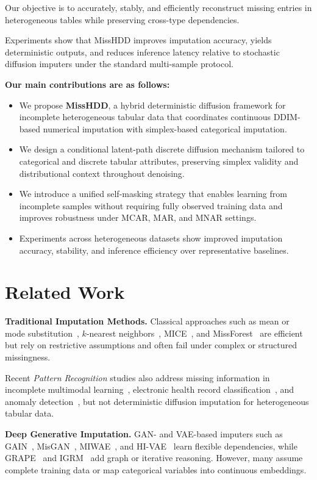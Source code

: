\documentclass[times, review, 10pt]{elsarticle}
\begin{document}
Our objective is to accurately, stably, and efficiently reconstruct missing entries in heterogeneous tables while preserving cross-type dependencies.

Experiments show that MissHDD improves imputation accuracy, yields deterministic outputs, and reduces inference latency relative to stochastic diffusion imputers under the standard multi-sample protocol.

\textbf{Our main contributions are as follows:}
\begin{itemize}
\item We propose \textbf{MissHDD}, a hybrid deterministic diffusion framework for incomplete heterogeneous tabular data that coordinates continuous DDIM-based numerical imputation with simplex-based categorical imputation.
\item We design a conditional latent-path discrete diffusion mechanism tailored to categorical and discrete tabular attributes, preserving simplex validity and distributional context throughout denoising.
\item We introduce a unified self-masking strategy that enables learning from incomplete samples without requiring fully observed training data and improves robustness under MCAR, MAR, and MNAR settings.
\item Experiments across heterogeneous datasets show improved imputation accuracy, stability, and inference efficiency over representative baselines.
\end{itemize}

\section{Related Work}

\textbf{Traditional Imputation Methods.}
Classical approaches such as mean or mode substitution~\cite{mean,mean2},
$k$-nearest neighbors~\cite{knn}, MICE~\cite{mice}, and
MissForest~\cite{missforest} are efficient but rely on restrictive assumptions
and often fail under complex or structured missingness.

Recent \textit{Pattern Recognition} studies also address missing information in
incomplete multimodal learning~\cite{mce2026}, electronic health record
classification~\cite{moss2026}, and anomaly detection~\cite{vmgm2026}, but not
deterministic diffusion imputation for heterogeneous tabular data.

\textbf{Deep Generative Imputation.}
GAN- and VAE-based imputers such as GAIN~\cite{yoon2018gain},
MisGAN~\cite{misGAN}, MIWAE~\cite{mattei2019miwae}, and HI-VAE~\cite{hivae}
learn flexible dependencies, while GRAPE~\cite{grape} and IGRM~\cite{igrm}
add graph or iterative reasoning. However, many assume complete training data
or map categorical variables into continuous embeddings.
\end{document}

